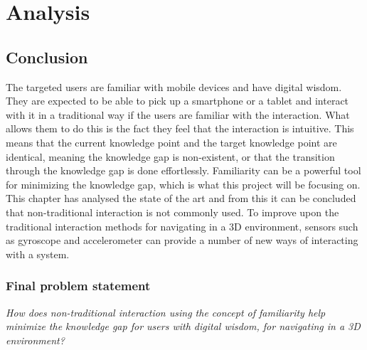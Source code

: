 \chapter{Analysis}







\section{Conclusion}

The targeted users are familiar with mobile devices and have digital wisdom. They are expected to be able to pick up a smartphone or a tablet and interact with it in a traditional way if the users are familiar with the interaction. What allows them to do this is the fact they feel that the interaction is intuitive. This means that the current knowledge point and the target knowledge point are identical, meaning the knowledge gap is non-existent, or that the transition through the knowledge gap is done effortlessly. Familiarity can be a powerful tool for minimizing the knowledge gap, which is what this project will be focusing on. This chapter has  analysed the state of the art and from this it can be concluded that non-traditional interaction is not commonly used. To improve upon the traditional interaction methods for navigating in a 3D environment, sensors such as gyroscope and accelerometer can provide a number of new ways of interacting with a system.

\subsection{Final problem statement}
\textit{How does non-traditional interaction using the concept of familiarity help minimize the knowledge gap for users with digital wisdom, for navigating in a 3D environment?}

